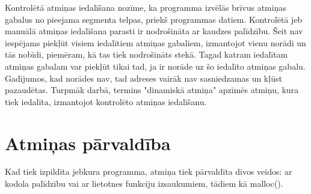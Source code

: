 Kontrolētā atmiņas iedalīšana nozīme, ka programma izvēlās brīvus atmiņas gabalus no pieejama segmenta telpas, priekš programmas datiem. 
Kontrolētā jeb manuālā atmiņas iedalīšana parasti ir nodrošināta ar kaudzes palīdzību.
Šeit nav iespējams piekļūt visiem iedalītiem atmiņas gabaliem, izmantojot vienu norādi un tās nobīdi, piemēram, kā tas tiek nodrošināts stekā. 
Tagad katram iedalītam atmiņas gabalam var piekļūt tikai tad, ja ir norāde uz šo iedalīto atmiņas gabalu. 
Gadījumos, kad norādes nav, tad adreses vairāk nav sasniedzamas un kļūst pazaudētas.
Turpmāk darbā, termins "dinamiskā atmiņa" apzīmēs atmiņu, kura tiek iedalīta, izmantojot kontrolēto atmiņas iedalīšanu.


\section{Atmiņas pārvaldība}
Kad tiek izpildīta jebkura programma, atmiņa tiek pārvaldīta divos veidos: ar kodola palīdzību vai ar lietotnes funkciju izsaukumiem, tādiem kā malloc().

